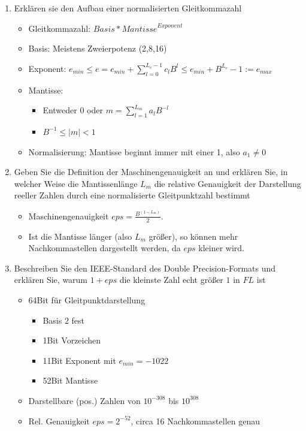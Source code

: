 \documentclass[]{article}
\begin{document}
\begin{enumerate}
	\item Erklären sie den Aufbau einer normalisierten Gleitkommazahl
		\begin{itemize}
			\item Gleitkommazahl: $\textit{Basis} * \textit{Mantisse}^{\textit{Exponent}}$
			\item Basis: Meistens Zweierpotenz (2,8,16)
			\item Exponent: $e_{min} \leq e = e_{min} + \sum_{l=0}^{L_e - 1}c_l B^l \leq e_{min} + B^{L_e} - 1 := e_{max}$
			\item Mantisse: \begin{itemize}
				\item Entweder 0 oder $m = \sum_{l=1}^{L_m}a_l B^{-l}$
				\item $B^{-1} \leq |m| < 1$
			\end{itemize}
			\item Normalisierung: Mantisse beginnt immer mit einer 1, also $a_1 \neq 0$
		\end{itemize}
	\item Geben Sie die Definition der Maschinengenauigkeit an und erklären Sie, in welcher Weise die Mantissenlänge $L_m$ die relative Genauigkeit der Darstellung reeller Zahlen durch eine normalisierte Gleitpunktzahl bestimmt
		\begin{itemize}
			\item Maschinengenauigkeit $eps = \frac{B^{(1 - L_m)}}{2}$.
			\item Ist die Mantisse länger (also $L_m$ größer), so können mehr Nachkommastellen dargestellt werden, da $eps$ kleiner wird.
		\end{itemize}
	\item Beschreiben Sie den IEEE-Standard des Double Precision-Formats und erklären Sie, warum $1+eps$ die kleinste Zahl echt größer $1$ in $FL$ ist
		\begin{itemize}
			\item 64Bit für Gleitpunktdarstellung
				\begin{itemize}
					\item Basis $2$ fest
					\item 1Bit Vorzeichen
					\item 11Bit Exponent mit $e_{min} = -1022$
					\item 52Bit Mantisse
				\end{itemize}
			\item Darstellbare (pos.) Zahlen von $10^{-308}$ bis $10^{308}$
			\item Rel. Genauigkeit $eps = 2^{-52}$, circa 16 Nachkommastellen genau

\end{itemize}
\end{enumerate}
\end{document}
